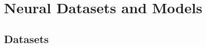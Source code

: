 \documentclass{article} %
\begin{document}
\section{Neural Datasets and Models} \label{appendix:models_and_datasets}

\subsection{Datasets} \label{appendix:datasets}
\end{document}
